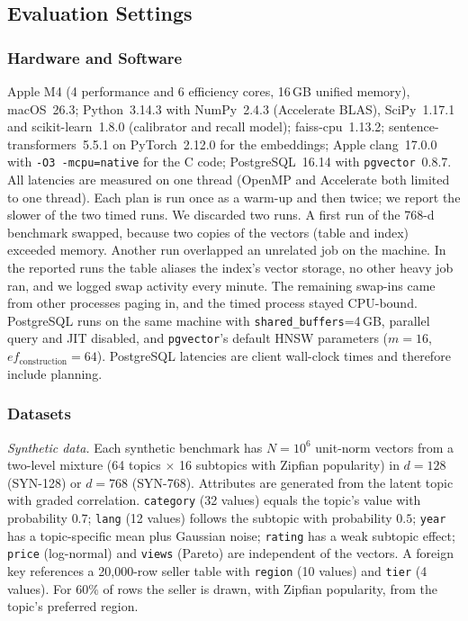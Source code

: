 \documentclass[sigconf,nonacm]{acmart}
\begin{document}
\subsection{Evaluation Settings}\label{sec:setup}
\subsubsection{Hardware and Software}
Apple M4 (4 performance and 6 efficiency cores, 16\,GB unified memory), macOS~26.3; Python~3.14.3 with NumPy~2.4.3 (Accelerate BLAS), SciPy~1.17.1 and scikit-learn~1.8.0 (calibrator and recall model); faiss-cpu~1.13.2; sentence-transformers~5.5.1 on PyTorch~2.12.0 for the embeddings; Apple clang~17.0.0 with \texttt{-O3 -mcpu=native} for the C code; PostgreSQL~16.14 with \texttt{pgvector}~0.8.7. All latencies are measured on one thread (OpenMP and Accelerate both limited to one thread). Each plan is run once as a warm-up and then twice; we report the slower of the two timed runs. We discarded two runs. A first run of the 768-d benchmark swapped, because two copies of the vectors (table and index) exceeded memory. Another run overlapped an unrelated job on the machine. In the reported runs the table aliases the index's vector storage, no other heavy job ran, and we logged swap activity every minute. The remaining swap-ins came from other processes paging in, and the timed process stayed CPU-bound. PostgreSQL runs on the same machine with \texttt{shared\_buffers}=4\,GB, parallel query and JIT disabled, and \texttt{pgvector}'s default HNSW parameters ($m=16$, $ef_{\text{construction}}=64$). PostgreSQL latencies are client wall-clock times and therefore include planning.


\subsubsection{Datasets}
\emph{Synthetic data.} Each synthetic benchmark has $N=10^6$ unit-norm vectors from a two-level mixture (64 topics $\times$ 16 subtopics with Zipfian popularity) in $d=128$ (SYN-128) or $d=768$ (SYN-768). Attributes are generated from the latent topic with graded correlation. \texttt{category} (32 values) equals the topic's value with probability $0.7$; \texttt{lang} (12 values) follows the subtopic with probability $0.5$; \texttt{year} has a topic-specific mean plus Gaussian noise; \texttt{rating} has a weak subtopic effect; \texttt{price} (log-normal) and \texttt{views} (Pareto) are independent of the vectors. A foreign key references a 20{,}000-row seller table with \texttt{region} (10 values) and \texttt{tier} (4 values). For $60\%$ of rows the seller is drawn, with Zipfian popularity, from the topic's preferred region.
\end{document}
